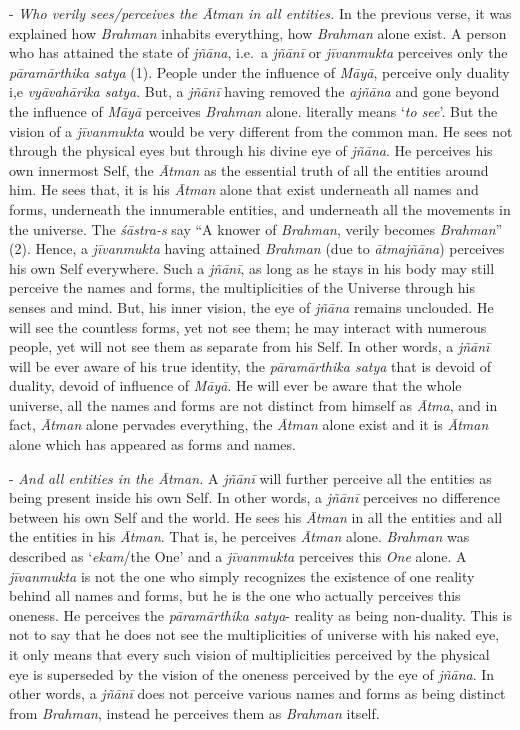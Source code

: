 - \emph{Who verily sees/perceives the Ātman in all entities.} In the previous verse, it was explained how \emph{Brahman} inhabits everything, how \emph{Brahman} alone exist. A person who has attained the state of \emph{jñāna}, i.e.\ a \emph{jñānī} or \emph{jīvanmukta} perceives only the \emph{pāramārthika satya} (1). People under the influence of \emph{Māyā}, perceive only duality i,e \emph{vyāvahārika satya}. But, a \emph{jñānī} having removed the \emph{ajñāna} and gone beyond the influence of \emph{Māyā} perceives \emph{Brahman} alone.  literally means `\emph{to see}'. But the vision of a \emph{jīvanmukta} would be very different from the common man. He sees not through the physical eyes but through his divine eye of \emph{jñāna}. He perceives his own innermost Self, the \emph{Ātman} as the essential truth of all the entities around him. He sees that, it is his \emph{Ātman} alone that exist underneath all names and forms, underneath the innumerable entities, and underneath all the movements in the universe. The \emph{śāstra-s} say ``A knower of \emph{Brahman}, verily becomes \emph{Brahman}'' (2). Hence, a \emph{jīvanmukta} having attained \emph{Brahman} (due to \emph{ātmajñāna}) perceives his own Self everywhere. Such a \emph{jñānī}, as long as he stays in his body may still perceive the names and forms, the multiplicities of the Universe through his senses and mind. But, his inner vision, the eye of \emph{jñāna} remains unclouded. He will see the countless forms, yet not see them; he may interact with numerous people, yet will not see them as separate from his Self. In other words, a \emph{jñānī} will be ever aware of his true identity, the \emph{pāramārthika satya} that is devoid of duality, devoid of influence of \emph{Māyā}. He will ever be aware that the whole universe, all the names and forms are not distinct from himself as \emph{Ātma}, and in fact, \emph{Ātman} alone pervades everything, the \emph{Ātman} alone exist and it is \emph{Ātman} alone which has appeared as forms and names.

- \emph{And all entities in the Ātman.} A \emph{jñānī} will further perceive all the entities as being present inside his own Self. In other words, a \emph{jñānī} perceives no difference between his own Self and the world. He sees his \emph{Ātman} in all the entities and all the entities in his \emph{Ātman}. That is, he perceives \emph{Ātman} alone. \emph{Brahman} was described as `\emph{ekam}/the One' and a \emph{jīvanmukta} perceives this \emph{One} alone. A \emph{jīvanmukta} is not the one who simply recognizes the existence of one reality behind all names and forms, but he is the one who actually perceives this oneness. He perceives the \emph{pāramārthika satya}- reality as being non-duality. This is not to say that he does not see the multiplicities of universe with his naked eye, it only means that every such vision of multiplicities perceived by the physical eye is superseded by the vision of the oneness perceived by the eye of \emph{jñāna}. In other words, a \emph{jñānī} does not perceive various names and forms as being distinct from \emph{Brahman}, instead he perceives them as \emph{Brahman} itself.


